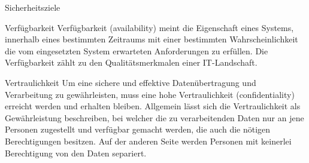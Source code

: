 \begin{section}{Sicherheitsziele}
   \label{Verfügbarkeit}
   \begin{subsection}{Verfügbarkeit}
    Verfügbarkeit (availability) meint die Eigenschaft eines Systems, innerhalb eines 
    bestimmten Zeitraums mit einer bestimmten Wahrscheinlichkeit die vom eingesetzten 
    System erwarteten Anforderungen zu erfüllen. Die Verfügbarkeit zählt zu den 
    Qualitätsmerkmalen einer IT-Landschaft.
    \\
   \end{subsection}

   \label{Vertraulichkeit}
   \begin{subsection}{Vertraulichkeit}
    Um eine sichere und effektive Datenübertragung und Verarbeitung zu gewährleisten, muss 
    eine hohe Vertraulichkeit (confidentiality) erreicht werden und erhalten bleiben. 
    Allgemein lässt sich die Vertraulichkeit als Gewährleistung beschreiben, bei welcher die 
    zu verarbeitenden Daten nur an jene Personen zugestellt und verfügbar gemacht werden, die 
    auch die nötigen Berechtigungen besitzen. Auf der anderen Seite werden Personen mit 
    keinerlei Berechtigung von den Daten separiert.
    \\
    \end{subsection}
    \pagebreak


\end{section}
